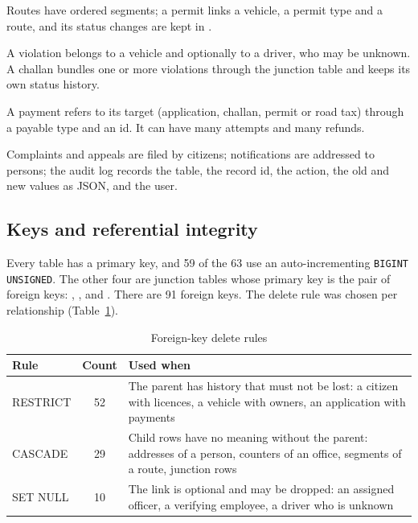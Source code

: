 Routes have ordered segments; a permit links a vehicle, a permit type and a route, and
its status changes are kept in .

A violation belongs to a vehicle and optionally to a driver, who may be unknown. A
challan bundles one or more violations through the junction table
 and keeps its own status history.

A payment refers to its target (application, challan, permit or road tax) through a
payable type and an id. It can have many attempts and many refunds.

Complaints and appeals are filed by citizens; notifications are addressed to persons; the
audit log records the table, the record id, the action, the old and new values as JSON,
and the user.

\subsection{Keys and referential integrity}
Every table has a primary key, and 59 of the 63 use an auto-incrementing
\texttt{BIGINT UNSIGNED}. The other four are junction tables whose primary key is the
pair of foreign keys: , ,
 and . There are 91 foreign keys.
The delete rule was chosen per relationship (Table~\ref{tab:fkrules}).

\begin{table}[H]
\centering\small
\caption{Foreign-key delete rules}\label{tab:fkrules}
\begin{tabularx}{\linewidth}{@{}p{2.4cm}cX@{}}
\toprule \textbf{Rule} & \textbf{Count} & \textbf{Used when}\\ \midrule
RESTRICT & 52 & The parent has history that must not be lost: a citizen with licences, a vehicle with owners, an application with payments\\
CASCADE & 29 & Child rows have no meaning without the parent: addresses of a person, counters of an office, segments of a route, junction rows\\
SET NULL & 10 & The link is optional and may be dropped: an assigned officer, a verifying employee, a driver who is unknown\\
\bottomrule
\end{tabularx}
\end{table}

